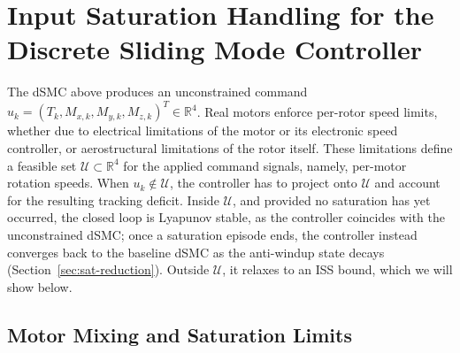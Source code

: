 \documentclass[conf]{new-aiaa}
\begin{document}
\section{Input Saturation Handling for the Discrete Sliding Mode Controller}

The dSMC above produces an unconstrained command $u_k = (T_k, M_{x,k}, M_{y,k}, M_{z,k})^T \in \mathbb{R}^4$. Real motors enforce per-rotor speed limits, whether due to electrical limitations of the motor or its electronic speed controller, or aerostructural limitations of the rotor itself. These limitations define a feasible set $\mathcal{U} \subset \mathbb{R}^4$ for the applied command signals, namely, per-motor rotation speeds. When $u_k \notin \mathcal{U}$, the controller has to project onto $\mathcal{U}$ and account for the resulting tracking deficit. Inside $\mathcal{U}$, and provided no saturation has yet occurred, the closed loop is Lyapunov stable, as the controller coincides with the unconstrained dSMC; once a saturation episode ends, the controller instead converges back to the baseline dSMC as the anti-windup state decays (Section~\ref{sec:sat-reduction}). Outside $\mathcal{U}$, it relaxes to an ISS bound, which we will show below.

\subsection{Motor Mixing and Saturation Limits}
\end{document}
